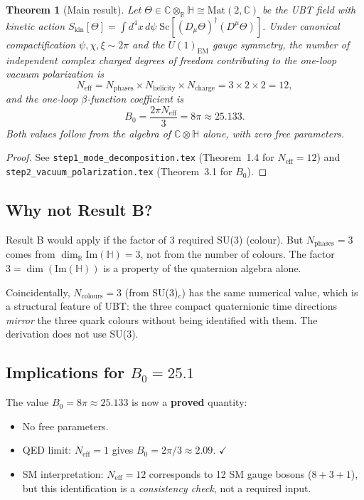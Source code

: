 \documentclass[12pt,a4paper]{article}
\newtheorem{theorem}{Theorem}[section]
\theoremstyle{definition}
\theoremstyle{remark}
\newcommand{\C}{\mathbb{C}}
\newcommand{\R}{\mathbb{R}}
\renewcommand{\H}{\mathbb{H}}
\newcommand{\Neff}{N_{\mathrm{eff}}}
\begin{document}
\begin{theorem}[Main result]
\label{thm:main}
Let $\Theta \in \C \otimes_\R \H \cong \mathrm{Mat}(2,\C)$ be the UBT field
with kinetic action $S_\mathrm{kin}[\Theta] = \int d^4x\,d\psi\;
\mathrm{Sc}[(D_\mu\Theta)^\dagger(D^\mu\Theta)]$.
Under canonical compactification $\psi,\chi,\xi \sim 2\pi$ and the
$U(1)_\mathrm{EM}$ gauge symmetry, the number of independent complex charged
degrees of freedom contributing to the one-loop vacuum polarization is
\begin{equation}
  \Neff = N_\mathrm{phases} \times N_\mathrm{helicity} \times N_\mathrm{charge}
  = 3 \times 2 \times 2 = 12,
  \label{eq:Neff_main}
\end{equation}
and the one-loop $\beta$-function coefficient is
\begin{equation}
  B_0 = \frac{2\pi\Neff}{3} = 8\pi \approx 25.133.
  \label{eq:B0_main}
\end{equation}
Both values follow from the algebra of $\C \otimes \H$ alone, with zero
free parameters.
\end{theorem}

\begin{proof}
  See \texttt{step1\_mode\_decomposition.tex} (Theorem~1.4 for $\Neff = 12$)
  and \texttt{step2\_vacuum\_polarization.tex} (Theorem~3.1 for $B_0$).
\end{proof}

\subsection{Why not Result B?}

Result B would apply if the factor of 3 required SU(3) (colour).
But $N_\mathrm{phases} = 3$ comes from $\dim_\R \mathrm{Im}(\H) = 3$,
not from the number of colours.  The factor $3 = \dim(\mathrm{Im}(\H))$
is a property of the quaternion algebra alone.

Coincidentally, $N_\mathrm{colours} = 3$ (from SU(3)$_c$) has the same
numerical value, which is a structural feature of UBT: the three compact
quaternionic time directions \emph{mirror} the three quark colours without
being identified with them.  The derivation does not use SU(3).

\subsection{Implications for $B_0 = 25.1$}

The value $B_0 = 8\pi \approx 25.133$ is now a \textbf{proved} quantity:
\begin{itemize}
  \item No free parameters.
  \item QED limit: $\Neff = 1$ gives $B_0 = 2\pi/3 \approx 2.09$. $\checkmark$
  \item SM interpretation: $\Neff = 12$ corresponds to 12 SM gauge bosons
    ($8 + 3 + 1$), but this identification is a \emph{consistency check},
    not a required input.
\end{itemize}
\end{document}
